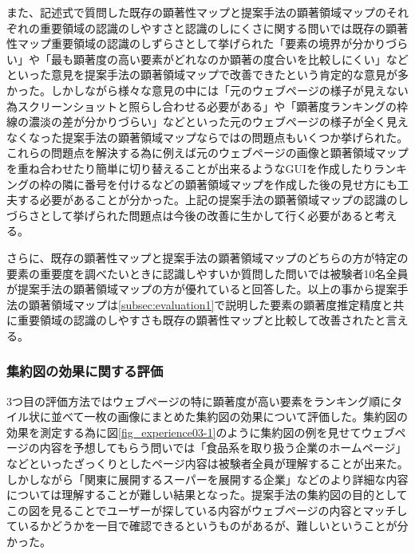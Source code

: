 \par また、記述式で質問した既存の顕著性マップと提案手法の顕著領域マップのそれぞれの重要領域の認識のしやすさと認識のしにくさに関する問いでは既存の顕著性マップ重要領域の認識のしずらさとして挙げられた「要素の境界が分かりづらい」や「最も顕著度の高い要素がどれなのか顕著の度合いを比較しにくい」などといった意見を提案手法の顕著領域マップで改善できたという肯定的な意見が多かった。しかしながら様々な意見の中には「元のウェブページの様子が見えない為スクリーンショットと照らし合わせる必要がある」や「顕著度ランキングの枠線の濃淡の差が分かりづらい」などといった元のウェブページの様子が全く見えなくなった提案手法の顕著領域マップならではの問題点もいくつか挙げられた。これらの問題点を解決する為に例えば元のウェブページの画像と顕著領域マップを重ね合わせたり簡単に切り替えることが出来るようなGUIを作成したりランキングの枠の隣に番号を付けるなどの顕著領域マップを作成した後の見せ方にも工夫する必要があることが分かった。上記の提案手法の顕著領域マップの認識のしづらさとして挙げられた問題点は今後の改善に生かして行く必要があると考える。

\par さらに、既存の顕著性マップと提案手法の顕著領域マップのどちらの方が特定の要素の重要度を調べたいときに認識しやすいか質問した問いでは被験者10名全員が提案手法の顕著領域マップの方が優れていると回答した。以上の事から提案手法の顕著領域マップは\ref{subsec:evaluation1}で説明した要素の顕著度推定精度と共に重要領域の認識のしやすさも既存の顕著性マップと比較して改善されたと言える。


\subsubsection{集約図の効果に関する評価}
\par 3つ目の評価方法ではウェブページの特に顕著度が高い要素をランキング順にタイル状に並べて一枚の画像にまとめた集約図の効果について評価した。集約図の効果を測定する為に図\ref{fig_experience03-1}のように集約図の例を見せてウェブページの内容を予想してもらう問いでは「食品系を取り扱う企業のホームページ」などといったざっくりとしたページ内容は被験者全員が理解することが出来た。しかしながら「関東に展開するスーパーを展開する企業」などのより詳細な内容については理解することが難しい結果となった。提案手法の集約図の目的としてこの図を見ることでユーザーが探している内容がウェブページの内容とマッチしているかどうかを一目で確認できるというものがあるが、難しいということが分かった。


